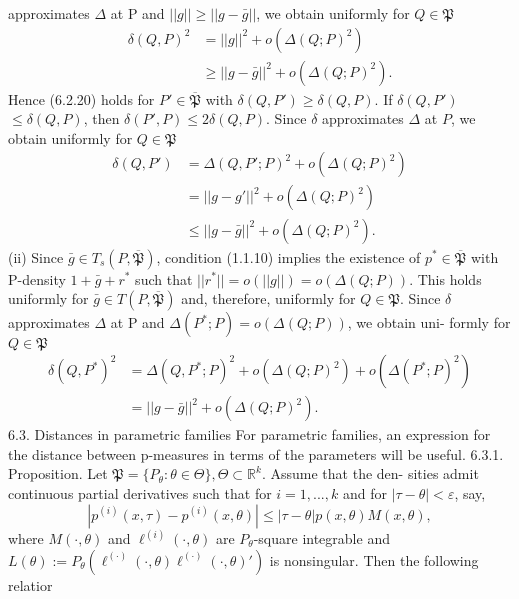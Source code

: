  approximates $\Delta$ at P and $||g|| \geq ||g-\bar{g}||$, we obtain uniformly for $Q \in \mathfrak{P}$ \begin{align*} \delta(Q,P)^2 &= ||g||^2 + o(\Delta(Q;P)^2) \\ &\geq ||g-\bar{g}||^2 + o(\Delta(Q;P)^2). \end{align*} Hence (6.2.20) holds for $P' \in \overline{\mathfrak{P}}$ with $\delta(Q,P') \geq \delta(Q,P)$. If $\delta(Q,P')$ $\leq \delta(Q,P)$, then $\delta(P',P) \leq 2\delta(Q,P)$. Since $\delta$ approximates $\Delta$ at $P$, we obtain uniformly for $Q \in \mathfrak{P}$ \begin{align*} \delta(Q,P') &= \Delta(Q,P';P)^2 + o(\Delta(Q;P)^2) \\ &= ||g-g'||^2 + o(\Delta(Q;P)^2) \\ &\leq ||g-\bar{g}||^2 + o(\Delta(Q;P)^2). \end{align*} (ii) Since $\bar{g} \in T_s(P,\overline{\mathfrak{P}})$, condition (1.1.10) implies the existence of $p^* \in \overline{\mathfrak{P}}$ with P-density $1+\bar{g}+r^*$ such that $||r^*|| = o(||g||) = o(\Delta(Q;P))$. This holds uniformly for $\bar{g} \in T(P,\overline{\mathfrak{P}})$ and, therefore, uniformly for $Q \in \mathfrak{P}$. Since $\delta$ approximates $\Delta$ at P and $\Delta(P^*;P) = o(\Delta(Q;P))$, we obtain uni- formly for $Q \in \mathfrak{P}$ \begin{align*} \delta(Q,P^*)^2 &= \Delta(Q,P^*;P)^2 + o(\Delta(Q;P)^2) + o(\Delta(P^*;P)^2) \\ &= ||g-\bar{g}||^2 + o(\Delta(Q;P)^2). \end{align*}  6.3. Distances in parametric families  For parametric families, an expression for the distance between p-measures in terms of the parameters will be useful.  6.3.1. Proposition. Let $\mathfrak{P} = \{P_\theta: \theta \in \Theta\}, \Theta \subset \mathbb{R}^k$. Assume that the den- sities admit continuous partial derivatives such that for $i = 1,...,k$ and for $|\tau-\theta| < \varepsilon$, say, $$|p^{(i)}(x,\tau) - p^{(i)}(x,\theta)| \leq |\tau-\theta|p(x,\theta)M(x,\theta),$$ where $M(\cdot,\theta)$ and $\ell^{(i)}(\cdot,\theta)$ are $P_\theta$-square integrable and $L(\theta) := P_\theta(\ell^{(\cdot)}(\cdot,\theta)\ell^{(\cdot)}(\cdot,\theta)')$ is nonsingular. Then the following relatior 